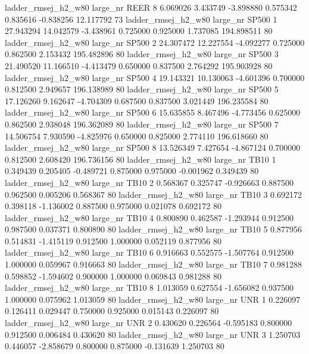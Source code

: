 ladder_rmsej_h2_w80   large_nr     REER                 8  6.069026  3.433749  -3.898880 0.575342 0.835616 -0.838256   12.117792 73
ladder_rmsej_h2_w80   large_nr    SP500                 1 27.943294 14.042579  -3.438961 0.725000 0.925000  1.737085  194.898511 80
ladder_rmsej_h2_w80   large_nr    SP500                 2 24.307472 12.227554  -4.092277 0.725000 0.862500  2.153432  195.482896 80
ladder_rmsej_h2_w80   large_nr    SP500                 3 21.490520 11.166510  -4.413479 0.650000 0.837500  2.764292  195.903928 80
ladder_rmsej_h2_w80   large_nr    SP500                 4 19.143321 10.130063  -4.601396 0.700000 0.812500  2.949657  196.138989 80
ladder_rmsej_h2_w80   large_nr    SP500                 5 17.126260  9.162647  -4.704309 0.687500 0.837500  3.021449  196.235584 80
ladder_rmsej_h2_w80   large_nr    SP500                 6 15.635855  8.467496  -4.773456 0.625000 0.862500  2.938048  196.362089 80
ladder_rmsej_h2_w80   large_nr    SP500                 7 14.506754  7.930590  -4.825976 0.650000 0.825000  2.774110  196.618660 80
ladder_rmsej_h2_w80   large_nr    SP500                 8 13.526349  7.427654  -4.867124 0.700000 0.812500  2.608420  196.736156 80
ladder_rmsej_h2_w80   large_nr     TB10                 1  0.349439  0.205405  -0.489721 0.875000 0.975000 -0.001962    0.349439 80
ladder_rmsej_h2_w80   large_nr     TB10                 2  0.568367  0.325747  -0.926663 0.887500 0.962500  0.005206    0.568367 80
ladder_rmsej_h2_w80   large_nr     TB10                 3  0.692172  0.398118  -1.136002 0.887500 0.975000  0.021078    0.692172 80
ladder_rmsej_h2_w80   large_nr     TB10                 4  0.800890  0.462587  -1.293944 0.912500 0.987500  0.037371    0.800890 80
ladder_rmsej_h2_w80   large_nr     TB10                 5  0.877956  0.514831  -1.415119 0.912500 1.000000  0.052119    0.877956 80
ladder_rmsej_h2_w80   large_nr     TB10                 6  0.916663  0.552575  -1.507764 0.912500 1.000000  0.059967    0.916663 80
ladder_rmsej_h2_w80   large_nr     TB10                 7  0.981288  0.598852  -1.594602 0.900000 1.000000  0.069843    0.981288 80
ladder_rmsej_h2_w80   large_nr     TB10                 8  1.013059  0.627554  -1.656082 0.937500 1.000000  0.075962    1.013059 80
ladder_rmsej_h2_w80   large_nr      UNR                 1  0.226097  0.126411   0.029447 0.750000 0.925000  0.015143    0.226097 80
ladder_rmsej_h2_w80   large_nr      UNR                 2  0.430620  0.226564  -0.595183 0.800000 0.912500  0.006484    0.430620 80
ladder_rmsej_h2_w80   large_nr      UNR                 3  1.250703  0.446057  -2.858679 0.800000 0.875000 -0.131639    1.250703 80
